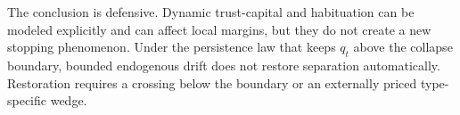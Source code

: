 The conclusion is defensive. Dynamic trust-capital and habituation can be modeled explicitly and can affect local margins, but they do not create a new stopping phenomenon. Under the persistence law that keeps $q_t$ above the collapse boundary, bounded endogenous drift does not restore separation automatically. Restoration requires a crossing below the boundary or an externally priced type-specific wedge.
